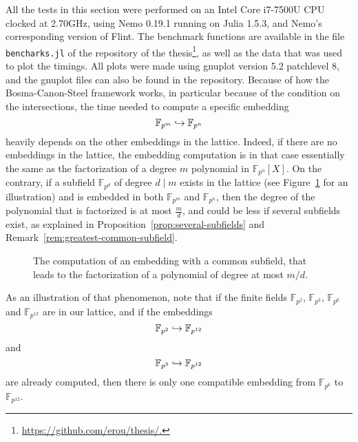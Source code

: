 All the tests in this section were performed on an Intel Core i7-7500U CPU
clocked at 2.70GHz, using Nemo 0.19.1 running on Julia 1.5.3, and
Nemo’s corresponding version of Flint. The benchmark functions are available in the
file \texttt{bencharks.jl} of the repository of the
thesis\footnote{\url{https://github.com/erou/thesis/.}}, as well as the data
that was used to plot the timings. All plots were made using gnuplot version 5.2
patchlevel 8, and the gnuplot files can also be found in the repository. Because
of how the Bosma-Canon-Steel framework works, in particular because of the
condition on the intersections, the time needed to compute a specific embedding
\[
  \mathbb{F}_{p^{m}}\hookrightarrow\mathbb{F}_{p^{n}}
\]
heavily depends on the other embeddings in the lattice. Indeed, if there are no
embeddings in the lattice, the embedding computation is in that case essentially
the same as the factorization of a degree $m$ polynomial in
$\mathbb{F}_{p^{n}}[X]$. On the contrary, if a subfield
$\mathbb{F}_{p^{d}}$ of degree $d\mid m$ exists in the lattice (see
Figure~\ref{fig:illustration-common-subfield} for an illustration) and is embedded
in both $\mathbb{F}_{p^{m}}$ and $\mathbb{F}_{p^{n}}$, then the degree of the
polynomial that is factorized is at most $\frac{m}{d}$, and could be less if
several subfields exist, as explained in
Proposition~\ref{prop:several-subfields} and
Remark~\ref{rem:greatest-common-subfield}.
\begin{figure}[h]
  \centering
  \caption{The computation of an embedding with a common subfield, that leads to
  the factorization of a polynomial of degree at most $m/d$.}
  \label{fig:illustration-common-subfield}
\end{figure}
As an illustration of that phenomenon, note that if the finite fields
$\mathbb{F}_{p^{2}}$, $\mathbb{F}_{p^{3}}$, $\mathbb{F}_{p^{6}}$ and
$\mathbb{F}_{p^{12}}$ are in our lattice, and if the embeddings
\[
  \mathbb{F}_{p^{2}}\hookrightarrow \mathbb{F}_{p^{12}}
\]
and
\[
  \mathbb{F}_{p^{3}}\hookrightarrow \mathbb{F}_{p^{12}}
\]
are already computed, then there is only one compatible embedding from
$\mathbb{F}_{p^{6}}$ to $\mathbb{F}_{p^{12}}$.
